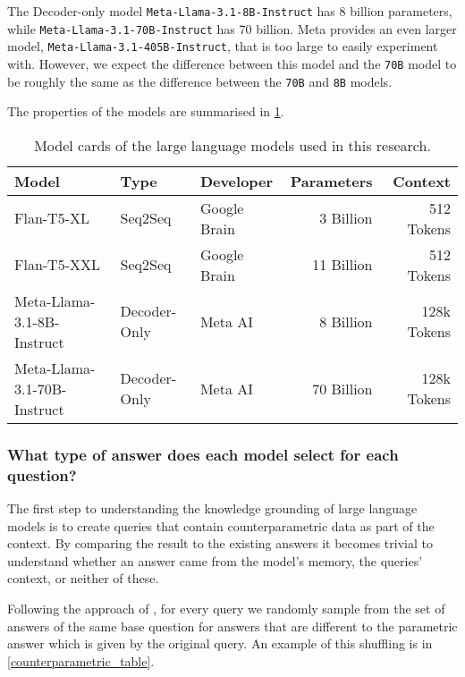 The Decoder-only model \texttt{Meta-Llama-3.1-8B-Instruct} has 8 billion parameters, while \texttt{Meta-Llama-3.1-70B-Instruct} has 70 billion.
Meta provides an even larger model, \texttt{Meta-Llama-3.1-405B-Instruct}, that is too large to easily experiment with.
However, we expect the difference between this model and the \texttt{70B} model to be roughly the same as the difference between the \texttt{70B} and \texttt{8B} models.

The properties of the models are summarised in \cref{model_card}.

\begin{table}[htbp]
	\centering
	\footnotesize
	\begin{tabular}{>{\ttfamily}l l l r r}
		\toprule
			\rmfamily \bfseries Model & \bfseries Type & \bfseries Developer & \bfseries Parameters & \bfseries Context \\
		\midrule
			Flan-T5-XL & Seq2Seq & Google Brain & 3 Billion & 512 Tokens \\
			Flan-T5-XXL & Seq2Seq & Google Brain & 11 Billion & 512 Tokens \\
			Meta-Llama-3.1-8B-Instruct & Decoder-Only & Meta AI & 8 Billion & 128k Tokens \\
			Meta-Llama-3.1-70B-Instruct & Decoder-Only & Meta AI & 70 Billion & 128k Tokens \\
		\bottomrule
	\end{tabular}
	\caption{Model cards of the large language models used in this research.}
	\label{model_card}
\end{table}

\subsubsection{What type of answer does each model select for each question?}
\label{methodology_type_of_answer}

The first step to understanding the knowledge grounding of large language models is to create queries that contain counterparametric data as part of the context.
By comparing the result to the existing answers it becomes trivial to understand whether an answer came from the model's memory, the queries' context, or neither of these.

Following the approach of \citeauthor{factual_recall}, for every query we randomly sample from the set of answers of the same base question for answers that are different to the parametric answer which is given by the original query.
An example of this shuffling is in \cref{counterparametric_table}.


